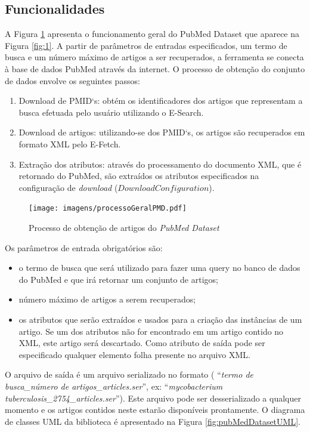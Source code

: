 \subsection{Funcionalidades}
A Figura \ref{fig:processoGeralPMD} apresenta o funcionamento geral do PubMed Dataset que aparece na Figura \ref{fig:1}. A partir de parâmetros de entradas especificados, um termo de busca e um número máximo de artigos a ser recuperados, a ferramenta se conecta à base de dados PubMed através da internet. O processo de obtenção do conjunto de dados envolve os seguintes passos:
\begin{enumerate}
    \item Download de PMID`s: obtém os identificadores dos artigos que representam a busca efetuada pelo usuário utilizando o E-Search.
    \item Download de artigos: utilizando-se dos PMID`s, os artigos são recuperados em formato XML pelo E-Fetch.
    \item Extração dos atributos: através do processamento do documento XML, que é retornado do PubMed, são extraídos os atributos especificados na configuração de \emph{download} ($DownloadConfiguration$).
\end{enumerate}

\begin{figure}[h!]
    \center    
    \texttt{[image: imagens/processoGeralPMD.pdf]}
    \caption{Processo de obtenção de artigos do \emph{PubMed Dataset}\label{fig:processoGeralPMD}}
\end{figure}

Os parâmetros de entrada obrigatórios são:
\begin{itemize}
    \item o termo de busca que será utilizado para fazer uma query no banco de dados do
PubMed e que irá retornar um conjunto de artigos;
    \item número máximo de artigos a serem recuperados;
    \item os atributos que serão extraídos e usados para a criação das instâncias de um artigo. Se um dos atributos não for encontrado em um artigo contido no XML, este artigo será descartado. Como atributo de saída pode ser especificado qualquer elemento folha presente no arquivo XML.
\end{itemize}

O arquivo de saída é um arquivo serializado no formato ( ``\emph{termo de busca\_número de artigos\_articles.ser}'', ex: ``\emph{mycobacterium tuberculosis\_2754\_articles.ser}''). Este arquivo pode ser desserializado a qualquer momento e os artigos contidos neste estarão disponíveis prontamente. O diagrama de classes UML da biblioteca é apresentado na Figura \ref{fig:pubMedDatasetUML}.

